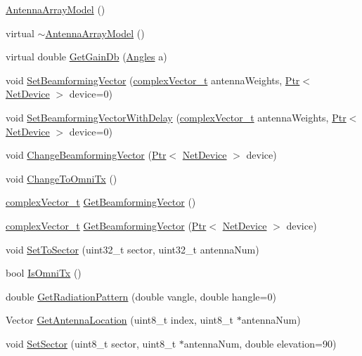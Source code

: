 \begin{DoxyCompactItemize}
\item 
\hyperlink{classns3_1_1AntennaArrayModel_a6b1706d9f58d98cc699681afafdf4189}{Antenna\+Array\+Model} ()
\item 
virtual \hyperlink{classns3_1_1AntennaArrayModel_a93f9b9a0503562e489b000601578f604}{$\sim$\+Antenna\+Array\+Model} ()
\item 
virtual double \hyperlink{classns3_1_1AntennaArrayModel_a40b60c560dddfa74b9b1ba15c1d097c1}{Get\+Gain\+Db} (\hyperlink{structns3_1_1Angles}{Angles} a)
\item 
void \hyperlink{classns3_1_1AntennaArrayModel_a9cc0c4b339cdd72be54276b6fc7044f1}{Set\+Beamforming\+Vector} (\hyperlink{namespacens3_a6a7f75817ae50e6ac47414955b17d926}{complex\+Vector\+\_\+t} antenna\+Weights, \hyperlink{classns3_1_1Ptr}{Ptr}$<$ \hyperlink{classns3_1_1NetDevice}{Net\+Device} $>$ device=0)
\item 
void \hyperlink{classns3_1_1AntennaArrayModel_a566ba77c8b98edeb5f5053cf4222b7a7}{Set\+Beamforming\+Vector\+With\+Delay} (\hyperlink{namespacens3_a6a7f75817ae50e6ac47414955b17d926}{complex\+Vector\+\_\+t} antenna\+Weights, \hyperlink{classns3_1_1Ptr}{Ptr}$<$ \hyperlink{classns3_1_1NetDevice}{Net\+Device} $>$ device=0)
\item 
void \hyperlink{classns3_1_1AntennaArrayModel_a88330469793f2104f27afa9e2577f130}{Change\+Beamforming\+Vector} (\hyperlink{classns3_1_1Ptr}{Ptr}$<$ \hyperlink{classns3_1_1NetDevice}{Net\+Device} $>$ device)
\item 
void \hyperlink{classns3_1_1AntennaArrayModel_a61dee879fab53e9bfa34764a363c406e}{Change\+To\+Omni\+Tx} ()
\item 
\hyperlink{namespacens3_a6a7f75817ae50e6ac47414955b17d926}{complex\+Vector\+\_\+t} \hyperlink{classns3_1_1AntennaArrayModel_a8245def599671617d7ea5b0c5b77498e}{Get\+Beamforming\+Vector} ()
\item 
\hyperlink{namespacens3_a6a7f75817ae50e6ac47414955b17d926}{complex\+Vector\+\_\+t} \hyperlink{classns3_1_1AntennaArrayModel_a5545b56d7107f44ee85b8ce1818682b6}{Get\+Beamforming\+Vector} (\hyperlink{classns3_1_1Ptr}{Ptr}$<$ \hyperlink{classns3_1_1NetDevice}{Net\+Device} $>$ device)
\item 
void \hyperlink{classns3_1_1AntennaArrayModel_a6e8b7fb4a1f918c40f997d9a49b99ae2}{Set\+To\+Sector} (uint32\+\_\+t sector, uint32\+\_\+t antenna\+Num)
\item 
bool \hyperlink{classns3_1_1AntennaArrayModel_ae69f6681be6c413862b25a873adbe8d3}{Is\+Omni\+Tx} ()
\item 
double \hyperlink{classns3_1_1AntennaArrayModel_a42084c709777cde3eedd4bd6564913fb}{Get\+Radiation\+Pattern} (double vangle, double hangle=0)
\item 
Vector \hyperlink{classns3_1_1AntennaArrayModel_a9b21531489117335610d19795e9e7339}{Get\+Antenna\+Location} (uint8\+\_\+t index, uint8\+\_\+t $\ast$antenna\+Num)
\item 
void \hyperlink{classns3_1_1AntennaArrayModel_a84e191f63ec2e127ec37ebf6de7c87e6}{Set\+Sector} (uint8\+\_\+t sector, uint8\+\_\+t $\ast$antenna\+Num, double elevation=90)
\end{DoxyCompactItemize}

